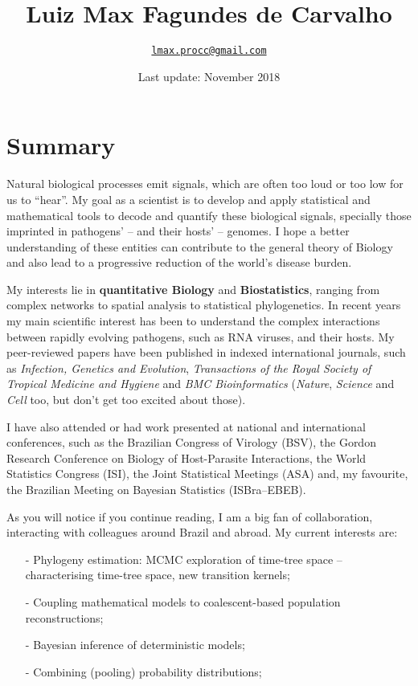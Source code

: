 \documentclass[10pt]{article}
\title{\bfseries Luiz Max Fagundes de Carvalho}
\author{\href{mailto:lmax.procc@gmail.com}{\nolinkurl{lmax.procc@gmail.com}}}
\affil{Programme for Scientific Computing (PROCC) and National School of Public Health (ENSP), Oswaldo Cruz Foundation, Brazil.}
\date{Last update: November 2018}
\begin{document}
\maketitle

\section*{Summary}

Natural biological processes emit signals, which are often too loud or too low for us to ``hear''.
My goal as a scientist is to develop and apply statistical and mathematical tools to decode and quantify these biological signals, specially those imprinted in pathogens' -- and their hosts' -- genomes.
I hope a better understanding of these entities can contribute to the general theory of Biology and also lead to a progressive reduction of the world's disease burden.

My interests lie in \textbf{quantitative Biology} and \textbf{Biostatistics}, ranging from complex networks to spatial analysis to statistical phylogenetics.
In recent years my main scientific interest has been to understand the complex interactions between rapidly evolving pathogens, such as {RNA} viruses, and their hosts.
My peer-reviewed papers have been published in indexed international journals, such as \textit{Infection, Genetics and Evolution}, \textit{Transactions of the Royal Society of Tropical Medicine and Hygiene} and \textit{BMC Bioinformatics} (\textit{Nature}, \textit{Science} and \textit{Cell} too, but don't get too excited about those).

I have also attended or had work presented at national and international conferences, such as the Brazilian Congress of Virology (BSV), the Gordon Research Conference on Biology of Host-Parasite Interactions, the World Statistics Congress (ISI), the Joint Statistical Meetings (ASA) and, my favourite, the Brazilian Meeting on Bayesian Statistics (ISBra--EBEB).

As you will notice if you continue reading, I am a big fan of collaboration, interacting with colleagues around Brazil and abroad.
My current interests are:
\begin{itemize}
\itemsep0.1em
 \item [-] Phylogeny estimation: MCMC exploration of time-tree space -- characterising time-tree space, new transition kernels;
 \item [-] Coupling mathematical models to coalescent-based population reconstructions;
 \item [-] Bayesian inference of deterministic models;
 \item [-] Combining (pooling) probability distributions;
\end{itemize}
\end{document}
